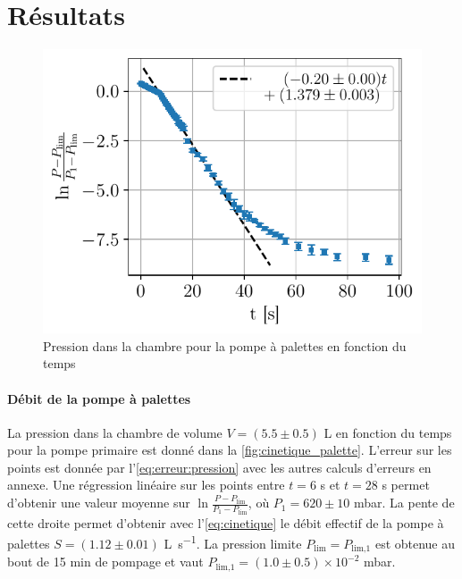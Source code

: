 \section{Résultats}

\begin{minipage}{\textwidth}
    \begin{figure}
        \centering
        \includegraphics[width=\linewidth]{figures/cinetique_palettes.pdf}
        \caption{Pression dans la chambre pour la pompe à palettes en fonction du temps}
        \label{fig:cinetique_palette}
    \end{figure}
    
    \paragraph*{Débit de la pompe à palettes}
    La pression dans la chambre de volume \(V = (5.5 \pm 0.5)\) \si{\liter} en fonction du temps pour la pompe primaire est donné dans la \autoref{fig:cinetique_palette}. L'erreur sur les points est donnée par l'\autoref{eq:erreur:pression} avec les autres calculs d'erreurs en annexe. Une régression linéaire sur les points entre \(t = 6\) \si{\second} et \(t = 28\) \si{\second} permet d'obtenir une valeur moyenne sur \(\ln{\frac{P - P_\textrm{lim}}{P_1 - P_\textrm{lim}}}\), où \(P_1 = 620 \pm 10\) \si{\milli\bar}. La pente de cette droite permet d'obtenir avec l'\autoref{eq:cinetique} le débit effectif de la pompe à palettes \(S = (1.12 \pm 0.01)\) \si{\liter \per \second}. La pression limite \(P_\textrm{lim} = P_\textrm{lim,1}\) est obtenue au bout de 15 \si{\minute} de pompage et vaut \(P_\textrm{lim,1} = (1.0 \pm 0.5) \times 10^{-2}\) \si{\milli\bar}.
\end{minipage}

